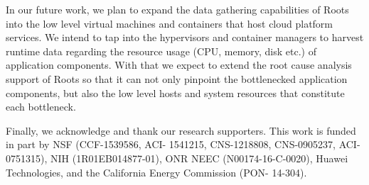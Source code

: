 In our future work, we plan to expand the data 
gathering capabilities of Roots into
the low level virtual machines and containers that host cloud
platform services. We intend to tap into the hypervisors
and container managers to harvest runtime data regarding the resource usage (CPU, memory, disk etc.) of
application components. With that we expect to extend
the root cause analysis support of Roots so that it can not only pinpoint the
bottlenecked application components, but also the low level hosts and system
resources that constitute each bottleneck.

Finally, we acknowledge and thank our research supporters.  This work is funded in part by NSF (CCF-1539586, ACI- 1541215, CNS-1218808, CNS-0905237, ACI-0751315), NIH (1R01EB014877-01), ONR NEEC (N00174-16-C-0020), Huawei Technologies, and the California Energy Commission (PON- 14-304).
